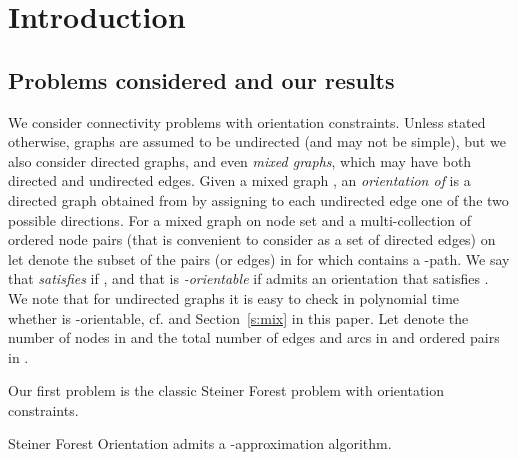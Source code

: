 \documentclass[envcountsame]{llncs}
\begin{document}
\section{Introduction}

\subsection{Problems considered and our results}

We consider connectivity problems with orientation constraints.
Unless stated otherwise, graphs are assumed to be undirected (and may not be simple), 
but we also consider directed graphs,
and even {\em mixed graphs}, which may have both directed and undirected edges.
Given a mixed graph , an {\em orientation of } is a directed graph  
obtained from  by assigning to each undirected edge one of the two possible directions.
For a mixed graph  on node set  and a multi-collection of 
ordered node pairs (that is convenient to consider as a set of directed edges)  on  
let  denote the subset of the pairs (or edges) in 
for which  contains a -path. We say that  {\em satisfies}  if ,
and that  is {\em -orientable} if  admits an orientation  that satisfies .
We note that for undirected graphs 
it is easy to check in polynomial time whether  is -orientable, cf. \cite{HM}
and Section~\ref{s:mix} in this paper.
Let  denote the number of nodes in  and  
the total number of edges and arcs in  and ordered pairs in .

Our first problem is the classic {\sf Steiner Forest} problem with orientation constraints.

\vspace{0.1cm}

\begin{center} 
\end{center}

\begin{theorem} \label{t:min}
{\sf Steiner Forest Orientation} admits a -approximation algorithm. 
\end{theorem}
\end{document}
